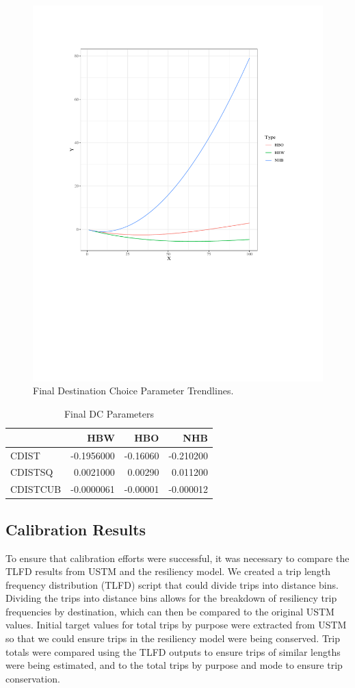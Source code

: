  \begin{figure}

 {\centering \includegraphics[width=0.75\linewidth]{figures/chapter3/final_DC.pdf}

 }

 \caption{Final Destination Choice Parameter Trendlines.}\label{fig:fdc}
 \end{figure}

\begin{table}

\caption{\label{tab:finaldc}Final DC Parameters}
\centering
\begin{tabular}[t]{lrrr}
\toprule
 & HBW & HBO & NHB\\
\midrule
CDIST & -0.1956000 & -0.16060 & -0.210200\\
CDISTSQ & 0.0021000 & 0.00290 & 0.011200\\
CDISTCUB & -0.0000061 & -0.00001 & -0.000012\\
\bottomrule
\end{tabular}
\end{table}

\subsection{Calibration Results}

To ensure that calibration efforts were successful, it was necessary to
compare the TLFD results from USTM and the resiliency model. We created a
trip length frequency distribution (TLFD) script that could divide trips
into distance bins. Dividing the trips into distance bins allows for the
breakdown of resiliency trip frequencies by destination, which can then be
compared to the original USTM values. Initial target values for total
trips by purpose were extracted from USTM so that we could ensure trips in
the resiliency model were being conserved. Trip totals were compared using
the TLFD outputs to ensure trips of similar lengths were being estimated,
and to the total trips by purpose and mode to ensure trip conservation.

